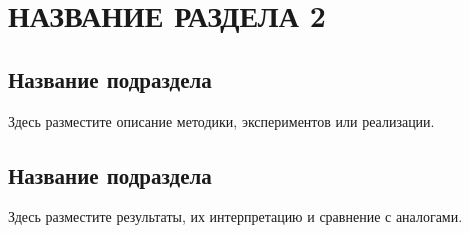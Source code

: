 \section{НАЗВАНИЕ РАЗДЕЛА 2}

\subsection{Название подраздела}

Здесь разместите описание методики, экспериментов или реализации.

\subsection{Название подраздела}

Здесь разместите результаты, их интерпретацию и сравнение с аналогами.


